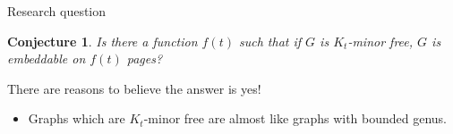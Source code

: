 \documentclass[]{beamer}
\newtheorem{conjecture}[theorem]{Conjecture}
\begin{document}
\begin{frame}{Research question}
	\begin{conjecture}
		Is there a function $f(t)$ such that if $G$ is $K_t$-minor free, $G$ is embeddable on $f(t)$ pages?
	\end{conjecture}
	There are reasons to believe the answer is yes!
	\begin{itemize}
		\item Graphs which are $K_t$-minor free are almost like graphs with bounded genus.
	\end{itemize}
\end{frame}




\end{document}
